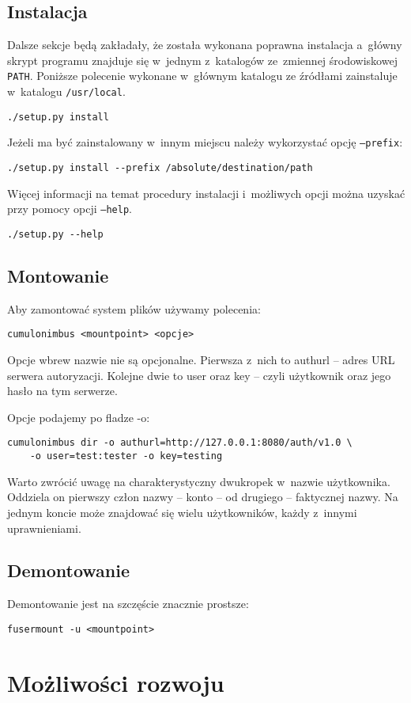 \subsection{Instalacja}

Dalsze sekcje będą zakładały, że została wykonana poprawna instalacja a~główny
skrypt programu znajduje się w~jednym z~katalogów ze~zmiennej środowiskowej
\texttt{PATH}. Poniższe polecenie wykonane w~głównym katalogu ze źródłami
zainstaluje \cb{} w~katalogu \texttt{/usr/local}.

\begin{verbatim}
./setup.py install
\end{verbatim}

Jeżeli \cb{} ma być zainstalowany w~innym miejscu należy wykorzystać opcję
\texttt{--prefix}:

\begin{verbatim}
./setup.py install --prefix /absolute/destination/path
\end{verbatim}

Więcej informacji na temat procedury instalacji i~możliwych opcji można uzyskać
przy pomocy opcji \texttt{--help}.

\begin{verbatim}
./setup.py --help
\end{verbatim}

\subsection{Montowanie}

Aby zamontować system plików używamy polecenia:

\begin{verbatim}
cumulonimbus <mountpoint> <opcje>
\end{verbatim}

Opcje wbrew nazwie nie są opcjonalne. Pierwsza z~nich to authurl -- adres URL
serwera autoryzacji. Kolejne dwie to user oraz key -- czyli użytkownik oraz
jego hasło na tym serwerze.

Opcje podajemy po fladze -o:

\begin{verbatim}
cumulonimbus dir -o authurl=http://127.0.0.1:8080/auth/v1.0 \
    -o user=test:tester -o key=testing
\end{verbatim}

Warto zwrócić uwagę na charakterystyczny dwukropek w~nazwie użytkownika.
Oddziela on pierwszy człon nazwy -- konto -- od drugiego -- faktycznej nazwy.
Na jednym koncie może znajdować się wielu użytkowników, każdy z~innymi
uprawnieniami.

\subsection{Demontowanie}

Demontowanie jest na szczęście znacznie prostsze:

\begin{verbatim}
fusermount -u <mountpoint>
\end{verbatim}

\section{Możliwości rozwoju}





